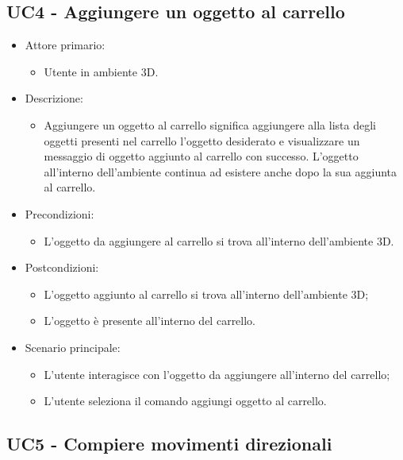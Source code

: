 \subsection{UC4 - Aggiungere un oggetto al carrello}
\begin{itemize}

	\item Attore primario: 
	\begin{itemize}
		\item Utente in ambiente 3D.
	\end{itemize}
	\item Descrizione:
	\begin{itemize}
		\item Aggiungere un oggetto al carrello significa aggiungere alla lista degli oggetti presenti nel carrello l'oggetto desiderato e visualizzare un messaggio di oggetto aggiunto al carrello con successo.
\newline L'oggetto all'interno dell'ambiente continua ad esistere anche dopo la sua aggiunta al carrello.
	\end{itemize}
	
	\item Precondizioni:
	\begin{itemize}
		\item L'oggetto da aggiungere al carrello si trova all'interno dell'ambiente 3D.
	\end{itemize}
	
	\item Postcondizioni:
	\begin{itemize}
		\item L'oggetto aggiunto al carrello si trova all'interno dell'ambiente 3D;
		\item L'oggetto è presente all'interno del carrello.
	\end{itemize}
	
	\item Scenario principale:
	\begin{itemize}
		\item L'utente interagisce con l'oggetto da aggiungere all'interno del carrello;
		\item L'utente seleziona il comando aggiungi oggetto al carrello.
	\end{itemize}
	
\end{itemize}

\pagebreak

\subsection{UC5 - Compiere movimenti direzionali}


